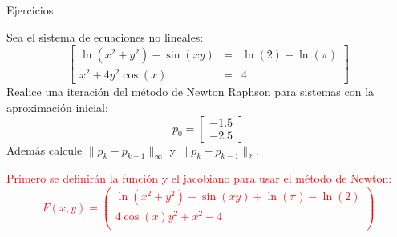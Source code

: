 \begin{frame}[fragile]{Ejercicios}
\label{EjercicioNewtonSistemas}
\begin{Eje}
Sea el sistema de ecuaciones no lineales:
\begin{displaymath}
\begin{bmatrix}
\ln(x^2+y^2)-\sin(xy) &=& \ln(2)-\ln(\pi)\\
x^2+4y^2\cos(x) &=&4
\end{bmatrix}
\end{displaymath}
Realice una iteración del método de Newton Raphson para sistemas con la aproximación inicial:
\begin{displaymath}
p_0=\begin{bmatrix}
-1.5\\
-2.5
\end{bmatrix}
\end{displaymath}
Además calcule $\parallel p_k-p_{k-1}\parallel_{\infty}$ y $\parallel p_k-p_{k-1}\parallel_2$.
\end{Eje}\pause
\textcolor{red}{
Primero se definirán la función y el jacobiano para usar el método de Newton:
\small
\begin{displaymath}
F(x,y)=\begin{pmatrix}
\ln(x^2+y^2)-\sin(xy)+\ln(\pi)-\ln(2)\\
4\cos(x)y^2+x^2-4\\
\end{pmatrix}
\end{displaymath}
}
\end{frame}
